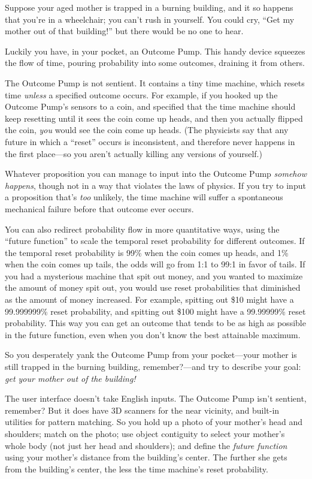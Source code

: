 {
 Suppose your aged mother is trapped in a burning building, and it
so happens that you're in a wheelchair; you
can't rush in yourself. You could cry,
``Get my mother out of that
building!'' but there would be no one to hear.}

{
 Luckily you have, in your pocket, an Outcome Pump. This handy
device squeezes the flow of time, pouring probability into some
outcomes, draining it from others.}

{
 The Outcome Pump is not sentient. It contains a tiny time machine,
which resets time \textit{unless} a specified outcome occurs. For
example, if you hooked up the Outcome Pump's sensors to
a coin, and specified that the time machine should keep resetting until
it sees the coin come up heads, and then you actually flipped the coin,
\textit{you} would see the coin come up heads. (The physicists say that
any future in which a ``reset''
occurs is inconsistent, and therefore never happens in the first
place---so you aren't actually killing any versions of
yourself.)}

{
 Whatever proposition you can manage to input into the Outcome Pump
\textit{somehow happens}, though not in a way that violates the laws of
physics. If you try to input a proposition that's
\textit{too} unlikely, the time machine will suffer a spontaneous
mechanical failure before that outcome ever occurs.}

{
 You can also redirect probability flow in more quantitative ways,
using the ``future function'' to
scale the temporal reset probability for different outcomes. If the
temporal reset probability is 99\% when the coin comes up heads, and
1\% when the coin comes up tails, the odds will go from 1:1 to 99:1 in
favor of tails. If you had a mysterious machine that spit out money,
and you wanted to maximize the amount of money spit out, you would use
reset probabilities that diminished as the amount of money increased.
For example, spitting out \$10 might have a 99.999999\% reset
probability, and spitting out \$100 might have a 99.99999\% reset
probability. This way you can get an outcome that tends to be as high
as possible in the future function, even when you don't
know the best attainable maximum.}

{
 So you desperately yank the Outcome Pump from your pocket---your
mother is still trapped in the burning building, remember?---and try to
describe your goal: \textit{get your mother out of the building!}}

{
 The user interface doesn't take English inputs.
The Outcome Pump isn't sentient, remember? But it does
have 3D scanners for the near vicinity, and built-in utilities for
pattern matching. So you hold up a photo of your
mother's head and shoulders; match on the photo; use
object contiguity to select your mother's whole body
(not just her head and shoulders); and define the \textit{future
function} using your mother's distance from the
building's center. The further she gets from the
building's center, the less the time
machine's reset probability.}

